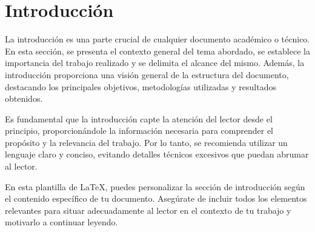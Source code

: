 \section{Introducción}

La introducción es una parte crucial de cualquier documento académico o técnico. En esta sección, se presenta el contexto general del tema abordado, se establece la importancia del trabajo realizado y se delimita el alcance del mismo. Además, la introducción proporciona una visión general de la estructura del documento, destacando los principales objetivos, metodologías utilizadas y resultados obtenidos.

Es fundamental que la introducción capte la atención del lector desde el principio, proporcionándole la información necesaria para comprender el propósito y la relevancia del trabajo. Por lo tanto, se recomienda utilizar un lenguaje claro y conciso, evitando detalles técnicos excesivos que puedan abrumar al lector.

En esta plantilla de LaTeX, puedes personalizar la sección de introducción según el contenido específico de tu documento. Asegúrate de incluir todos los elementos relevantes para situar adecuadamente al lector en el contexto de tu trabajo y motivarlo a continuar leyendo.

\newpage